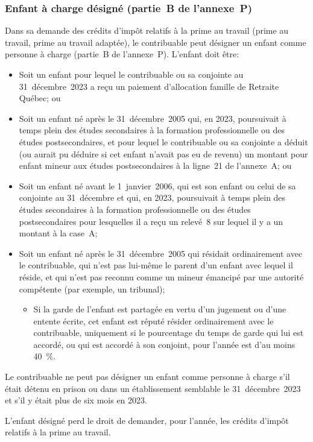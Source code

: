 \subsubsection{Enfant à charge désigné (partie~B de l'annexe~P)}
Dans sa demande des crédits d'impôt relatifs à la prime au travail (prime au travail, prime au travail adaptée), le contribuable peut désigner un enfant comme personne à charge (partie~B de l'annexe~P). L'enfant doit être:
\begin{itemize}
	\item Soit un enfant pour lequel le contribuable ou sa conjointe au 31~décembre~2023 a reçu un paiement d'allocation famille de Retraite Québec; ou
	\item Soit un enfant né après le 31~décembre~2005 qui, en 2023, poursuivait à temps plein des études secondaires à la formation professionnelle ou des études postsecondaires, et pour lequel le contribuable ou sa conjointe a déduit (ou aurait pu déduire si cet enfant n'avait pas eu de revenu) un montant pour enfant mineur aux études postsecondaires à la ligne~21 de l'annexe~A; ou
	\item Soit un enfant né avant le 1\ier{}~janvier~2006, qui est son enfant ou celui de sa conjointe au 31~décembre et qui, en 2023, poursuivait à temps plein des études secondaires à la formation professionnelle ou des études postsecondaires pour lesquelles il a reçu un relevé~8 sur lequel il y a un montant à la case~A;
	\item Soit un enfant né après le 31~décembre~2005 qui résidait ordinairement avec le contribuable, qui n'est pas lui-même le parent d'un enfant avec lequel il réside, et qui n'est pas reconnu comme un mineur émancipé par une autorité compétente (par exemple, un tribunal);
	\begin{itemize}
		\item Si la garde de l'enfant est partagée en vertu d'un jugement ou d'une entente écrite, cet enfant est réputé résider ordinairement avec le contribuable, uniquement si le pourcentage du temps de garde qui lui est accordé, ou qui est accordé à son conjoint, pour l'année est d'au moins 40~\%.
	\end{itemize}
\end{itemize}

Le contribuable ne peut pas désigner un enfant comme personne à charge s'il était détenu en prison ou dans un établissement semblable le 31~décembre~2023 et s'il y était plus de six mois en 2023. 

\begin{note}
	L'enfant désigné perd le droit de demander, pour l'année, les crédits d'impôt relatifs à la prime au travail.
\end{note}

